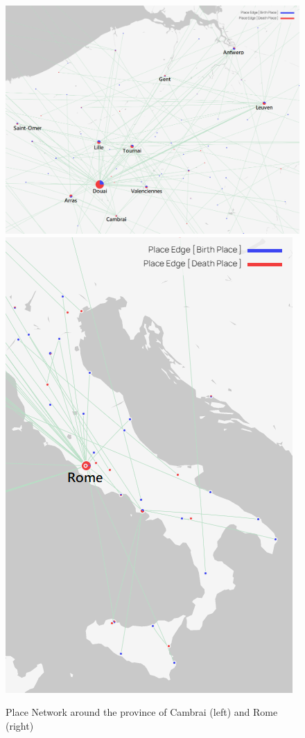 \documentclass[12pt,a4paper,oneside]{book}
\begin{document}
\begin{sloppypar}
\begin{figure}[H]
\centering
\includegraphics[scale=0.45]{graph/Cambrai_annotated.png}
\includegraphics[scale=0.58]{graph/Rome_annotated.png}
\caption{Place Network around the province of Cambrai (left) and Rome (right)}
\label{fig:aroundCandR}
\end{figure}


\end{sloppypar}
\end{document}

